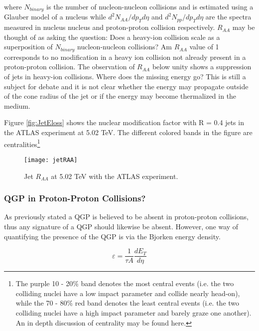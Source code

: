 \noindent
where $N_{binary}$ is the number of nucleon-nucleon collisions and is estimated using a Glauber model\cite{Miller:2007ri} of a nucleus while $d^{2}N_{AA}/dp_{T}d\eta$ and $d^{2}N_{pp}/dp_{T}d\eta$ are the spectra measured in nucleus nucleus and proton-proton collision respectively.  $R_{AA}$ may be thought of as asking the question: Does a heavy-ion collision scale as a superposition of $N_{binary}$ nucleon-nucleon collisions?  Am $R_{AA}$ value of 1 corresponds to no modification in a heavy ion collision not already present in a proton-proton collision.  The observation of $R_{AA}$ below unity shows a suppression of jets in heavy-ion collisions.  Where does the missing energy go?  This is still a subject for debate and it is not clear whether the energy may propagate outside of the cone radius of the jet or if the energy may become thermalized in the medium.


Figure \ref{fig:JetEloss} shows the nuclear modification factor with R = 0.4 jets in the ATLAS experiment at 5.02 TeV\cite{Aaboud:2018twu}.  The different colored bands in the figure are centralities\footnote{The purple 10 - 20\% band denotes the most central events (i.e. the two colliding nuclei have a low impact parameter and collide nearly head-on), while the 70 - 80\% red band denotes the least central events (i.e. the two colliding nuclei have a high impact parameter and barely graze one another).  An in depth discussion of centrality may be found here\cite{Klochkov_2017}.}

\begin{figure}[h]
\texttt{[image: jetRAA]}
\centering
\caption{Jet $R_{AA}$ at 5.02 TeV with the ATLAS experiment\cite{Aaboud:2018twu}.}
\label{fig:JetRAA}
\end{figure}



\subsubsection{QGP in Proton-Proton Collisions?}
As previously stated a QGP is believed to be absent in proton-proton collisions, thus any signature of a QGP should likewise be absent.  However, one way of quantifying the presence of the QGP is via the Bjorken energy density.  

\begin{equation}
\varepsilon = \frac{1}{\tau A} \frac{dE_{T}}{d \eta}
\label{eq:bjorkenEt}
\end{equation}

